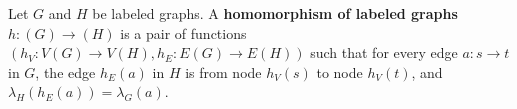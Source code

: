 
\begin{definition}
    \label{def:graph:homomorphism}
    Let \( G \) and \( H \) be labeled graphs. A \textbf{homomorphism of labeled graphs} $h:(G) \mathop{\rightarrow} (H)$ is a pair of functions $(h_V: V(G) \mathop{\to} V(H), h_E: E(G) \mathop{\to} E(H))$ such that for every edge \( a: s \mathop{\to} t \) in \( G \), the edge \( h_E(a) \) in $H$ is from node \( h_V(s) \) to node \( h_V(t) \), and \( \lambda_H(h_E(a)) \mathop{=} \lambda_G(a) \).
\end{definition}

